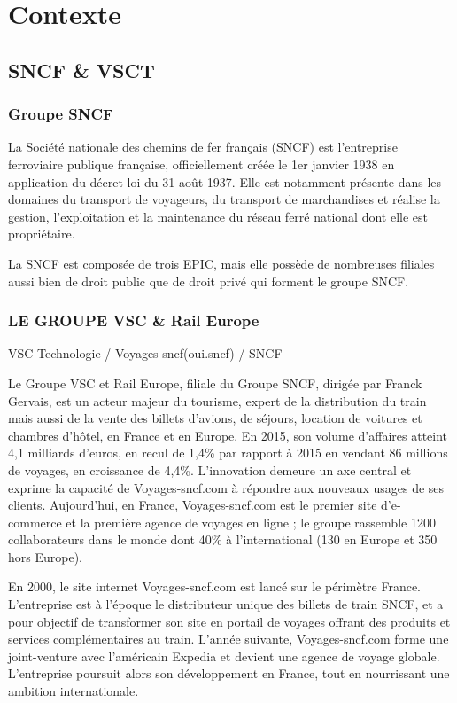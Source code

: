 \chapter{Contexte}

\section{SNCF \& VSCT}
\subsection{Groupe SNCF}
La Société nationale des chemins de fer français (SNCF) est l'entreprise ferroviaire publique française, officiellement créée le 1er janvier 1938 en application du décret-loi du 31 août 1937. Elle est notamment présente dans les domaines du transport de voyageurs, du transport de marchandises et réalise la gestion, l'exploitation et la maintenance du réseau ferré national dont elle est propriétaire.

La SNCF est composée de trois EPIC, mais elle possède de nombreuses filiales aussi bien de droit public que de droit privé qui forment le groupe SNCF.
\clearpage

\subsection{LE GROUPE VSC \& Rail Europe}
VSC Technologie / Voyages-sncf(oui.sncf) / SNCF

Le Groupe VSC et Rail Europe, filiale du Groupe SNCF, dirigée par Franck Gervais, est un acteur majeur du tourisme, expert de la distribution du train mais aussi de la vente des billets d'avions, de séjours, location de voitures et chambres d'hôtel, en France et en Europe. En 2015, son volume d’affaires atteint 4,1 milliards d’euros, en recul de 1,4\% par rapport à 2015 en vendant 86 millions de voyages, en croissance de 4,4\%. L’innovation demeure un axe central et exprime la capacité de Voyages-sncf.com à répondre aux nouveaux usages de ses clients. Aujourd’hui, en France, Voyages-sncf.com est le premier site d’e-commerce et la première agence de voyages en ligne ; le groupe rassemble 1200 collaborateurs dans le monde dont 40\% à l'international (130 en Europe et 350 hors Europe).

En 2000, le site internet Voyages-sncf.com est lancé sur le périmètre France. L’entreprise est à l’époque le distributeur unique des billets de train SNCF, et a pour objectif de transformer son site en portail de voyages offrant des produits et services complémentaires au train. L’année suivante, Voyages-sncf.com forme une joint-venture avec l’américain Expedia et devient une agence de voyage globale. L’entreprise poursuit alors son développement en France, tout en nourrissant une ambition internationale.

